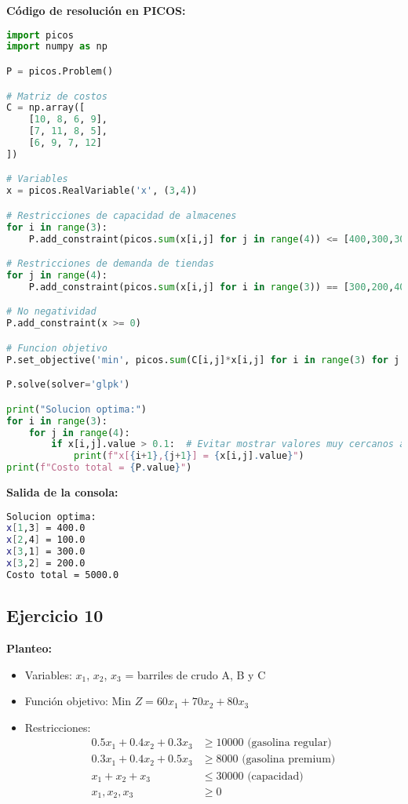 \documentclass[12pt]{article}
\begin{document}
\begin{enumerate}
\textbf{Código de resolución en PICOS:}
\begin{lstlisting}[language=Python]
import picos
import numpy as np

P = picos.Problem()

# Matriz de costos
C = np.array([
    [10, 8, 6, 9],
    [7, 11, 8, 5],
    [6, 9, 7, 12]
])

# Variables
x = picos.RealVariable('x', (3,4))

# Restricciones de capacidad de almacenes
for i in range(3):
    P.add_constraint(picos.sum(x[i,j] for j in range(4)) <= [400,300,300][i])

# Restricciones de demanda de tiendas
for j in range(4):
    P.add_constraint(picos.sum(x[i,j] for i in range(3)) == [300,200,400,100][j])

# No negatividad
P.add_constraint(x >= 0)

# Funcion objetivo
P.set_objective('min', picos.sum(C[i,j]*x[i,j] for i in range(3) for j in range(4)))

P.solve(solver='glpk')

print("Solucion optima:")
for i in range(3):
    for j in range(4):
        if x[i,j].value > 0.1:  # Evitar mostrar valores muy cercanos a cero
            print(f"x[{i+1},{j+1}] = {x[i,j].value}")
print(f"Costo total = {P.value}")
\end{lstlisting}

\textbf{Salida de la consola:}
\begin{lstlisting}[language=bash,backgroundcolor=\color{black},basicstyle=\color{white}\ttfamily,numbers=none]
Solucion optima:
x[1,3] = 400.0
x[2,4] = 100.0
x[3,1] = 300.0
x[3,2] = 200.0
Costo total = 5000.0
\end{lstlisting}

\newpage

\subsection*{Ejercicio 10}

\textbf{Planteo:}
\begin{itemize}
\item Variables: $x_1$, $x_2$, $x_3$ = barriles de crudo A, B y C
\item Función objetivo: Min $Z = 60x_1 + 70x_2 + 80x_3$
\item Restricciones:
  \begin{align*}
  0.5x_1 + 0.4x_2 + 0.3x_3 &\geq 10000 \text{ (gasolina regular)} \\
  0.3x_1 + 0.4x_2 + 0.5x_3 &\geq 8000 \text{ (gasolina premium)} \\
  x_1 + x_2 + x_3 &\leq 30000 \text{ (capacidad)} \\
  x_1, x_2, x_3 &\geq 0
  \end{align*}
\end{itemize}


\end{enumerate}
\end{document}
